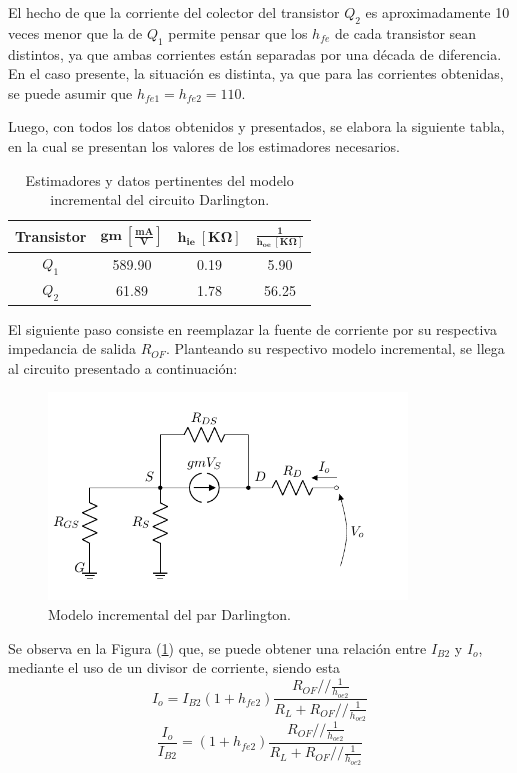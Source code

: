 El hecho de que la corriente del colector del transistor $Q_2$ es aproximadamente 10 veces menor que la de $Q_1$ permite pensar que los $h_{fe}$ de cada transistor sean distintos, ya que ambas corrientes están separadas por una década de diferencia. En el caso presente, la situación es distinta, ya que para las corrientes obtenidas, se puede asumir que $h_{fe1} = h_{fe2} = 110$.

Luego, con todos los datos obtenidos y presentados, se elabora la siguiente tabla, en la cual se presentan los valores de los estimadores necesarios.
\begin{table}[H]
\centering
\begin{tabular}{cccc}
\hline
\textbf{Transistor} & $\mathbf{gm \ \left[ \frac{mA}{V} \right]}$ & $\mathbf{h_{ie} \ \left[ K\Omega \right]}$ & $\mathbf{\frac{1}{h_{oe} \ \left[ K\Omega \right]}}$ \\
\hline
$Q_1$ & 589.90 & 0.19 & 5.90 \\
$Q_2$ & 61.89 & 1.78 & 56.25	\\
\hline
\end{tabular}
\caption{Estimadores y datos pertinentes del modelo incremental del circuito Darlington.}
\label{tab:estim}
\end{table}

El siguiente paso consiste en reemplazar la fuente de corriente por su respectiva impedancia de salida $R_{OF}$. Planteando su respectivo modelo incremental, se llega al circuito presentado a continuación: 
\begin{figure}[H]
\centering
	\includegraphics[width=0.85\textwidth, page=3]{Imagenes/ModeloIncremental.pdf}
	\caption{Modelo incremental del par Darlington.}
\label{fig:incdar}
\end{figure}

Se observa en la Figura (\ref{fig:incdar}) que, se puede obtener una relación entre $I_{B2}$ y $I_o$, mediante el uso de un divisor de corriente, siendo esta
\begin{equation*}
	I_o = I_{B2} \left( 1 + h_{fe2} \right) \frac{R_{OF} // \frac{1}{h_{oe2}}}{R_L + R_{OF} // \frac{1}{h_{oe2}}}
\end{equation*}
\begin{equation}
	\frac{I_o}{I_{B2}} = \left( 1 + h_{fe2} \right) \frac{R_{OF} // \frac{1}{h_{oe2}}}{R_L + R_{OF} // \frac{1}{h_{oe2}}}
	\label{equ:io-ib2}
\end{equation}

